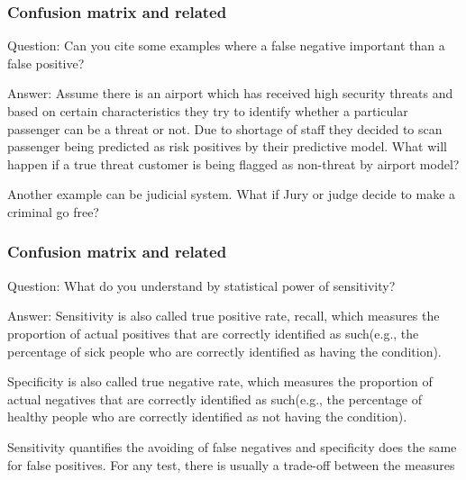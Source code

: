 \documentclass[11pt]{beamer}
\begin{document}
\begin{frame}
\frametitle{Confusion matrix and related}
\begin{block}{Question:}
	Can you cite some examples where a false negative important than a false positive?
\end{block}
\begin{block}{Answer:}
	Assume there is an airport which has received high security threats and based on certain characteristics they try to identify whether a particular passenger can be a threat or not. Due to shortage of staff they decided to scan passenger being predicted as risk positives by their predictive model.
	What will happen if a true threat customer is being flagged as non-threat by airport model?
	
	Another example can be judicial system. What if Jury or judge decide to make a criminal go free?
\end{block}
\end{frame}

\begin{frame}
\frametitle{Confusion matrix and related}
\begin{block}{Question:}
	What do you understand by statistical power of sensitivity?
\end{block}
\begin{block}{Answer:}
	Sensitivity is also called true positive rate, recall, which measures the proportion of actual positives that are correctly identified as such(e.g., the percentage of sick people who are correctly identified as having the condition).
	
	Specificity is also called true negative rate, which measures the proportion of actual negatives that are correctly identified as such(e.g., the percentage of healthy people who are correctly identified as not having the condition).
	
	Sensitivity quantifies the avoiding of false negatives and specificity does the same for false positives. For any test, there is usually a trade-off between the measures
\end{block}
\end{frame}
\end{document}
